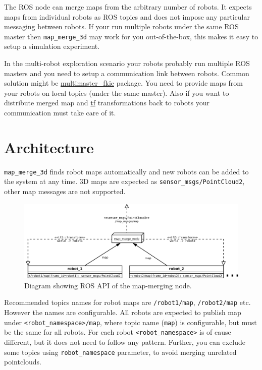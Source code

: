 The \gls{ROS} node can merge maps from the arbitrary number of robots. It expects maps from individual robots as \gls{ROS} topics and does not impose any particular messaging between robots. If your run multiple robots under the same \gls{ROS} master then \texttt{map\_merge\_3d} may work for you out-of-the-box, this makes it easy to setup a simulation experiment.

In the multi-robot exploration scenario your robots probably run multiple \gls{ROS} masters and you need to setup a communication link between robots. Common solution might be \href{http://wiki.ros.org/multimaster_fkie}{multimaster\_fkie} package. You need to provide maps from your robots on local topics (under the same master). Also if you want to distribute merged map and \href{http://wiki.ros.org/tf}{tf} transformations back to robots your communication must take care of it.

\section{Architecture}

\texttt{map\_merge\_3d} finds robot maps automatically and new robots can be added to the system at any time. 3D maps are expected as \texttt{sensor\_msgs/PointCloud2}, other map messages are not supported.

\begin{figure}
    \centering
    \includegraphics[width=\textwidth]{../img/architecture.pdf}
    \caption[The architecture of the \texttt{map\_merge\_node}]{Diagram showing \gls{ROS} \gls{API} of the map-merging node.}
    \label{fig:architecture}
\end{figure}

Recommended topics names for robot maps are \texttt{/robot1/map}, \texttt{/robot2/map} etc. However the names are configurable. All robots are expected to publish map under \texttt{<robot\_namespace>/map}, where topic name (\texttt{map}) is configurable, but must be the same for all robots. For each robot \texttt{<robot\_namespace>} is of cause different, but it does not need to follow any pattern. Further, you can exclude some topics using \texttt{robot\_namespace} parameter, to avoid merging unrelated pointclouds.

